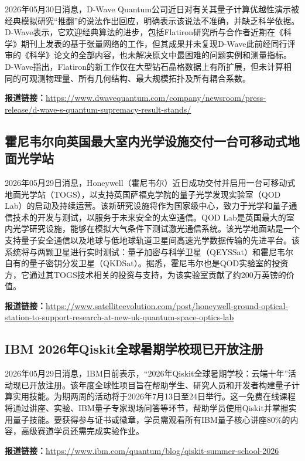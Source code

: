 \documentclass[12pt,a4paper]{ctexart}
\begin{document}
2026年05月30日消息，D-Wave Quantum公司近日对有关其量子计算优越性演示被经典模拟研究“推翻”的说法作出回应，明确表示该说法不准确，并缺乏科学依据。D-Wave表示，它欢迎经典算法的进步，包括Flatiron研究所与合作者近期在《科学》期刊上发表的基于张量网络的工作，但其成果并未复现D-Wave此前经同行评审的《科学》论文的全部内容，也未解决原文中最困难的问题实例和测量指标。D-Wave指出，Flatiron的新工作仅在大型钻石晶格数据上有所扩展，但未计算相同的可观测物理量、所有几何结构、最大规模拓扑及所有耦合系数。

\noindent\textbf{报道链接：}\url{https://www.dwavequantum.com/company/newsroom/press-release/d-wave-s-quantum-supremacy-result-stands/}

\subsection{ 霍尼韦尔向英国最大室内光学设施交付一台可移动式地面光学站 }

2026年05月29日消息，Honeywell（霍尼韦尔）近日成功交付并启用一台可移动式地面光学站（TOGS），以支持英国萨福克学院的量子光学发现实验室（QOD Lab）的启动及持续运营。该新研究设施将作为国家级中心，致力于光学和量子通信技术的开发与测试，以服务于未来安全的太空通信。QOD Lab是英国最大的室内光学研究设施，能够在模拟大气条件下测试激光通信系统。该光学地面站是一个支持量子安全通信以及地球与低地球轨道卫星间高速光学数据传输的先进平台。该系统将与两颗卫星进行实时测试：量子加密与科学卫星（QEYSSat）和霍尼韦尔自有的量子密钥分发卫星（QKDSat）。据悉，霍尼韦尔也是QOD实验室的投资方，它通过其TOGS技术相关的投资与支持，为该实验室贡献了约200万英镑的价值。

\noindent\textbf{报道链接：}\url{https://www.satelliteevolution.com/post/honeywell-ground-optical-station-to-support-research-at-new-uk-quantum-space-optics-lab}

\subsection{ IBM 2026年Qiskit全球暑期学校现已开放注册 }

2026年05月29日消息，IBM日前表示，“2026年Qiskit全球暑期学校：云端十年”活动现已开放注册。该年度全球性项目旨在帮助学生、研究人员和开发者构建量子计算实用技能。为期两周的活动将于2026年7月13日至24日举行。这一免费在线课程将通过讲座、实验、IBM量子专家现场问答等环节，帮助学员使用Qiskit并掌握实用量子技能。要获得参与证书或徽章，学员需观看所有IBM量子核心讲座80\%的内容，高级赛道学员还需完成实验作业。

\noindent\textbf{报道链接：}\url{https://www.ibm.com/quantum/blog/qiskit-summer-school-2026}
\end{document}
